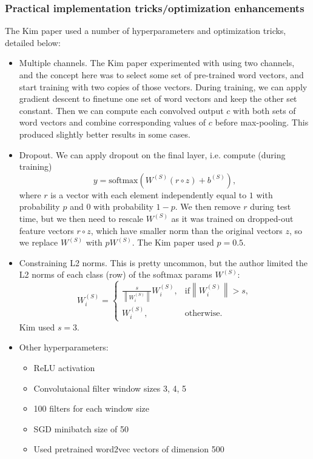 \subsubsection{Practical implementation tricks/optimization enhancements}
The Kim paper used a number of hyperparameters and optimization tricks, detailed below:
\begin{itemize}
\item Multiple channels. The Kim paper experimented with using two channels, and the concept here was to select some set of pre-trained word vectors, and start training with two copies of those vectors. During training, we can apply gradient descent to finetune one set of word vectors and keep the other set constant. Then we can compute each convolved output $c$ with both sets of word vectors and combine corresponding values of $c$ before max-pooling. This produced slightly better results in some cases.
\item Dropout. We can apply dropout on the final layer, i.e. compute (during training)
$$y = \text{softmax}\left(W^{(S)}(r \circ z) + b^{(S)}\right),$$
where $r$ is a vector with each element independently equal to $1$ with probability $p$ and $0$ with probability $1-p$. We then remove $r$ during test time, but we then need to rescale $W^{(S)}$ as it was trained on dropped-out feature vectors $r \circ z$, which have smaller norm than the original vectors $z$, so we replace $W^{(S)}$ with $pW^{(S)}$. The Kim paper used $p = 0.5$.
\item Constraining L2 norms. This is pretty uncommon, but the author limited the L2 norms of each class (row) of the softmax params $W^{(S)}$:
\begin{equation*}
W_i^{(S)} = 
\begin{cases}
\frac{s}{\left\|W_i^{(S)}\right\|}W_i^{(S)}, &\text{if} \left\|W_i^{(S)}\right\| > s,\\
W_i^{(S)}, &\text{otherwise.} 
\end{cases}
\end{equation*}
Kim used $s = 3$.
\item Other hyperparameters:
\begin{itemize}
\item ReLU activation
\item Convolutaional filter window sizes 3, 4, 5
\item 100 filters for each window size
\item SGD minibatch size of 50
\item Used pretrained word2vec vectors of dimension 500
\end{itemize}
\end{itemize}

